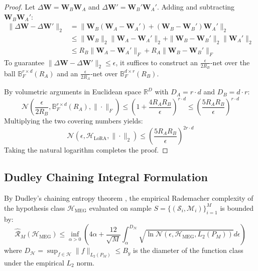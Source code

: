 \documentclass{article}
\theoremstyle{definition}
\begin{document}
\begin{proof}
Let $\Delta \mathbf{W} = \mathbf{W}_B \mathbf{W}_A$ and $\Delta \mathbf{W}' = \mathbf{W}_B' \mathbf{W}_A'$. Adding and subtracting $\mathbf{W}_B \mathbf{W}_A'$:
\begin{align}
\|\Delta \mathbf{W} - \Delta \mathbf{W}'\|_2 &= \|\mathbf{W}_B(\mathbf{W}_A - \mathbf{W}_A') + (\mathbf{W}_B - \mathbf{W}_B')\mathbf{W}_A'\|_2 \\
&\le \|\mathbf{W}_B\|_2 \|\mathbf{W}_A - \mathbf{W}_A'\|_2 + \|\mathbf{W}_B - \mathbf{W}_B'\|_2 \|\mathbf{W}_A'\|_2 \\
&\le R_B \|\mathbf{W}_A - \mathbf{W}_A'\|_F + R_A \|\mathbf{W}_B - \mathbf{W}_B'\|_F
\end{align}
To guarantee $\|\Delta \mathbf{W} - \Delta \mathbf{W}'\|_2 \le \epsilon$, it suffices to construct an $\frac{\epsilon}{2 R_B}$-net over the ball $\mathbb{B}_F^{r \times d}(R_A)$ and an $\frac{\epsilon}{2 R_A}$-net over $\mathbb{B}_F^{d \times r}(R_B)$.

By volumetric arguments in Euclidean space $\mathbb{R}^D$ with $D_A = r \cdot d$ and $D_B = d \cdot r$:
\begin{equation}
\mathcal{N}\left(\frac{\epsilon}{2 R_B}, \mathbb{B}_F^{r \times d}(R_A), \|\cdot\|_F\right) \le \left( 1 + \frac{4 R_A R_B}{\epsilon} \right)^{r \cdot d} \le \left( \frac{5 R_A R_B}{\epsilon} \right)^{r \cdot d}
\end{equation}
Multiplying the two covering numbers yields:
\begin{equation}
\mathcal{N}\left(\epsilon, \mathcal{H}_{\text{LoRA}}, \|\cdot\|_2\right) \le \left( \frac{5 R_A R_B}{\epsilon} \right)^{2 r \cdot d}
\end{equation}
Taking the natural logarithm completes the proof.
\end{proof}

\subsection{Dudley Chaining Integral Formulation}
By Dudley's chaining entropy theorem \citep{dudley1967sizes}, the empirical Rademacher complexity of the hypothesis class $\mathcal{H}_{\text{MEG}}$ evaluated on sample $S = \{(\mathcal{S}_i, \mathcal{M}_i)\}_{i=1}^M$ is bounded by:
\begin{equation}
\hat{\mathcal{R}}_M(\mathcal{H}_{\text{MEG}}) \le \inf_{\alpha > 0} \left( 4 \alpha + \frac{12}{\sqrt{M}} \int_{\alpha}^{D_{\mathcal{H}}} \sqrt{\ln \mathcal{N}\left(\epsilon, \mathcal{H}_{\text{MEG}}, L_2(P_M)\right)} d\epsilon \right)
\label{eq:dudley_integral}
\end{equation}
where $D_{\mathcal{H}} = \sup_{f \in \mathcal{H}} \|f\|_{L_2(P_M)} \le B_y$ is the diameter of the function class under the empirical $L_2$ norm.
\end{document}
